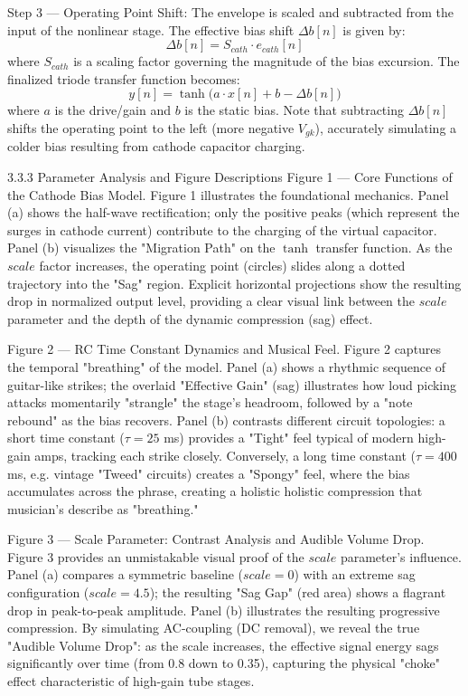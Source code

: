 Step 3 — Operating Point Shift: The envelope is scaled and subtracted from the input of the nonlinear stage. The effective bias shift $\Delta b[n]$ is given by: $$ \Delta b[n] = S_{cath} \cdot e_{cath}[n] \tag{8} $$ where $S_{cath}$ is a scaling factor governing the magnitude of the bias excursion. The finalized triode transfer function becomes: $$ y[n] = \tanh\bigl(a \cdot x[n] + b - \Delta b[n]\bigr) \tag{9} $$ where $a$ is the drive/gain and $b$ is the static bias. Note that subtracting $\Delta b[n]$ shifts the operating point to the left (more negative $V_{gk}$), accurately simulating a colder bias resulting from cathode capacitor charging.

3.3.3 Parameter Analysis and Figure Descriptions
Figure 1 --- Core Functions of the Cathode Bias Model. Figure 1 illustrates the foundational mechanics. Panel (a) shows the half-wave rectification; only the positive peaks (which represent the surges in cathode current) contribute to the charging of the virtual capacitor. Panel (b) visualizes the "Migration Path" on the $\tanh$ transfer function. As the $scale$ factor increases, the operating point (circles) slides along a dotted trajectory into the "Sag" region. Explicit horizontal projections show the resulting drop in normalized output level, providing a clear visual link between the $scale$ parameter and the depth of the dynamic compression (sag) effect.

Figure 2 --- RC Time Constant Dynamics and Musical Feel. Figure 2 captures the temporal "breathing" of the model. Panel (a) shows a rhythmic sequence of guitar-like strikes; the overlaid "Effective Gain" (sag) illustrates how loud picking attacks momentarily "strangle" the stage's headroom, followed by a "note rebound" as the bias recovers. Panel (b) contrasts different circuit topologies: a short time constant ($\tau = 25$ ms) provides a "Tight" feel typical of modern high-gain amps, tracking each strike closely. Conversely, a long time constant ($\tau = 400$ ms, e.g. vintage "Tweed" circuits) creates a "Spongy" feel, where the bias accumulates across the phrase, creating a holistic holistic compression that musician's describe as "breathing."

Figure 3 --- Scale Parameter: Contrast Analysis and Audible Volume Drop. Figure 3 provides an unmistakable visual proof of the $scale$ parameter's influence. Panel (a) compares a symmetric baseline ($scale=0$) with an extreme sag configuration ($scale=4.5$); the resulting "Sag Gap" (red area) shows a flagrant drop in peak-to-peak amplitude. Panel (b) illustrates the resulting progressive compression. By simulating AC-coupling (DC removal), we reveal the true "Audible Volume Drop": as the scale increases, the effective signal energy sags significantly over time (from 0.8 down to 0.35), capturing the physical "choke" effect characteristic of high-gain tube stages.

